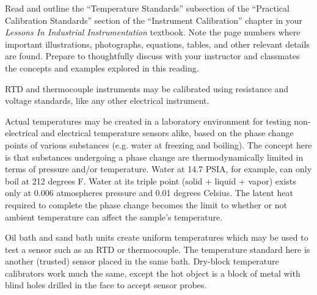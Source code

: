 

Read and outline the ``Temperature Standards'' subsection of the ``Practical Calibration Standards'' section of the ``Instrument Calibration'' chapter in your {\it Lessons In Industrial Instrumentation} textbook.  Note the page numbers where important illustrations, photographs, equations, tables, and other relevant details are found.  Prepare to thoughtfully discuss with your instructor and classmates the concepts and examples explored in this reading.














RTD and thermocouple instruments may be calibrated using resistance and voltage standards, like any other electrical instrument.

\vskip 10pt

Actual temperatures may be created in a laboratory environment for testing non-electrical and electrical temperature sensors alike, based on the phase change points of various substances (e.g. water at freezing and boiling).  The concept here is that substances undergoing a phase change are thermodynamically limited in terms of pressure and/or temperature.  Water at 14.7 PSIA, for example, can only boil at 212 degrees F.  Water at its triple point (solid + liquid + vapor) exists only at 0.006 atmospheres pressure and 0.01 degrees Celsius.  The latent heat required to complete the phase change becomes the limit to whether or not ambient temperature can affect the sample's temperature.

\vskip 10pt

Oil bath and sand bath units create uniform temperatures which may be used to test a sensor such as an RTD or thermocouple.  The temperature standard here is another (trusted) sensor placed in the same bath.  Dry-block temperature calibrators work much the same, except the hot object is a block of metal with blind holes drilled in the face to accept sensor probes.

\vskip 10pt

